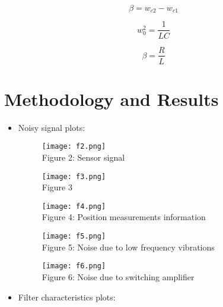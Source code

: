 \documentclass[12pt,a4paper]{article}
\begin{document}
\begin{equation}
    \beta = w_{c2} - w_{c1}
\end{equation}

\begin{equation}
    w_0^2 = \frac{1}{LC}
\end{equation}

\begin{equation}
    \beta = \frac{R}{L}
\end{equation}

\clearpage
\section{Methodology and Results}\label{sec:meth}

\begin{itemize}
    \item 
    Noisy signal plots:

\begin{figure}[h]
    \centering
    \texttt{[image: f2.png]}
    \\Figure 2: Sensor signal
\end{figure}

\begin{figure}[h]
    \centering
    \texttt{[image: f3.png]}
    \\Figure 3
\end{figure}
\clearpage

\begin{figure}[h]
    \centering
    \texttt{[image: f4.png]}
    \\Figure 4: Position measurements information
\end{figure}

\begin{figure}[h]
    \centering
    \texttt{[image: f5.png]}
    \\Figure 5: Noise due to low frequency vibrations
\end{figure}
\clearpage

\begin{figure}[h]
    \centering
    \texttt{[image: f6.png]}
    \\Figure 6: Noise due to switching amplifier
\end{figure}

    \item
    Filter characteristics plots:
    

\end{itemize}
\end{document}
